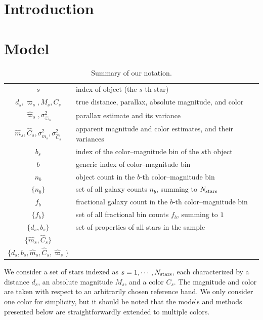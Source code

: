\documentclass[aps,prd,showpacs,superscriptaddress,groupedaddress]{revtex4}  %
\newcommand{\nobj}{{N_{\rm stars}}}
\begin{document}
\section{Introduction}


\section{Model}


\begin{table} %
\centering
\begin{tabular}{cl}
\hline
$s$	&	index of object (the $s$-th star)\\
$d_s, \varpi_s, M_s, C_s$	&	true distance, parallax, absolute magnitude, and color	\\
$\hat{\varpi}_s, \sigma_{\hat{\varpi}_s}^2$ 	&	parallax estimate and its variance\\
$\hat{m}_s, \hat{C}_s, \sigma^2_{\hat{m}_s}, \sigma^2_{\hat{C}_s}$ 	&	apparent magnitude and color estimates, and their variances\\
$b_s$	&	index of the color--magnitude bin of the $s$th object\\
\hline
$b$	&	generic index of color--magnitude bin\\
$n_b$	& 	object count in the $b$-th color--magnitude bin  \\
$\{n_b\}$	&	set of all galaxy counts $n_b$, summing to $\nobj$\\
$f_b$	&	fractional galaxy count in the $b$-th color--magnitude bin  \\
$\{f_b\}$	&	set of all fractional bin counts $f_b$, summing to $1$\\
$\{ d_s, b_s\}$	&	set of properties of all stars in the sample	\\
$\{ \hat{m}_s, \hat{C}_s \}$ &	\\
$\{ d_s, b_s, \hat{m}_s, \hat{C}_s, \hat{\varpi}_s \}$	 	&	\\
\hline
\end{tabular}
\caption{Summary of our notation. }
\label{tab:notation}
\end{table} 

We consider a set of stars indexed as $s=1, \cdots, \nobj$, each characterized by a distance $d_s$, an absolute magnitude $M_s$, and a color $C_s$. 
The magnitude and color are taken with respect to an arbitrarily chosen reference band.
We only consider one color for simplicity, but it should be noted that the models and methods presented below are straightforwardly extended to multiple colors.
\end{document}
